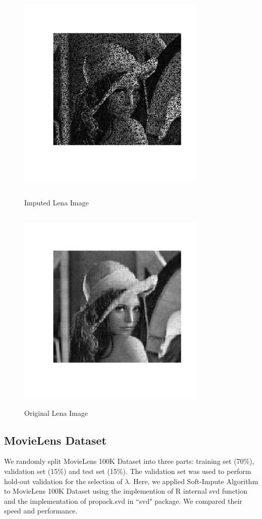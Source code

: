 \documentclass[12pt]{article}
\begin{document}
\begin{figure}[H]
	\centering
	\begin{minipage}[c]{0.49\textwidth}
		\centering
		\includegraphics[angle=0,width=9cm,height=10cm]{lena4}
		\caption{Imputed Lena Image}\label{lena4}
	\end{minipage}
	\begin{minipage}[c]{0.49\textwidth}
		\centering
		\includegraphics[angle=0,width=9cm,height=10cm]{lena5}
		\caption{Original Lena Image}\label{lena5}
	\end{minipage}
\end{figure}

\subsection{MovieLens Dataset}
We randomly split MovieLens 100K Dataset into three parts: training set (70\%), validation
set (15\%) and test set (15\%). The validation set was used to perform hold-out validation for the selection of $\lambda$. Here, we applied Soft-Impute Algorithm to MovieLens 100K Dataset using the implemention of R internal svd function and the implementation of propack.svd in ``svd" package. We compared their speed and performance. 
\end{document}
